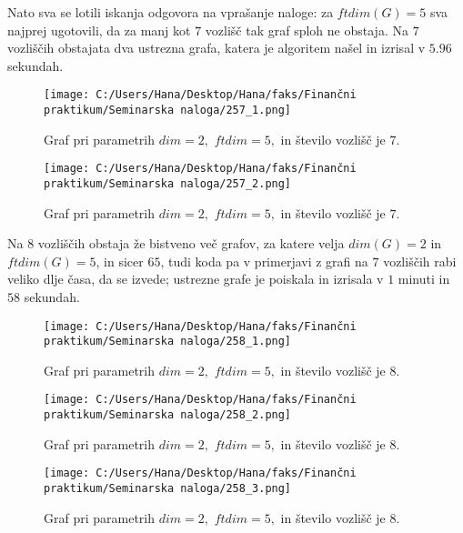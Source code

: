 \documentclass[12pt]{article}
\begin{document}
Nato sva se lotili iskanja odgovora na vprašanje naloge: za $ftdim(G) = 5$ sva najprej ugotovili, da za manj kot $7$ 
vozlišč tak graf sploh ne obstaja. Na $7$ vozliščih obstajata dva ustrezna grafa, katera je algoritem našel in izrisal v 
$5.96$ sekundah.

\begin{figure}[H]
    \centering
    \texttt{[image: C:/Users/Hana/Desktop/Hana/faks/Finančni praktikum/Seminarska naloga/257\_1.png]}
    \caption{Graf pri parametrih $dim = 2,$ $ftdim = 5,$ in število vozlišč je $7.$}
    \label{fig:slika257_1}
\end{figure}

\begin{figure}[H]
    \centering
    \texttt{[image: C:/Users/Hana/Desktop/Hana/faks/Finančni praktikum/Seminarska naloga/257\_2.png]}
    \caption{Graf pri parametrih $dim = 2,$ $ftdim = 5,$ in število vozlišč je $7.$}
    \label{fig:slika257_2}
\end{figure}

Na $8$ vozliščih obstaja že bistveno več grafov, za katere velja $dim(G) = 2$ in $ftdim(G) = 5$, in sicer $65$, tudi koda 
pa v primerjavi z grafi na $7$ vozliščih rabi veliko dlje časa, da se izvede; ustrezne grafe je poiskala in izrisala v $1$ 
minuti in $58$ sekundah. 

\begin{figure}[H]
    \centering
    \texttt{[image: C:/Users/Hana/Desktop/Hana/faks/Finančni praktikum/Seminarska naloga/258\_1.png]}
    \caption{Graf pri parametrih $dim = 2,$ $ftdim = 5,$ in število vozlišč je $8.$}
    \label{fig:slika258_1}
\end{figure}

\begin{figure}[H]
    \centering
    \texttt{[image: C:/Users/Hana/Desktop/Hana/faks/Finančni praktikum/Seminarska naloga/258\_2.png]}
    \caption{Graf pri parametrih $dim = 2,$ $ftdim = 5,$ in število vozlišč je $8.$}
    \label{fig:slika258_2}
\end{figure}

\begin{figure}[H]
    \centering
    \texttt{[image: C:/Users/Hana/Desktop/Hana/faks/Finančni praktikum/Seminarska naloga/258\_3.png]}
    \caption{Graf pri parametrih $dim = 2,$ $ftdim = 5,$ in število vozlišč je $8.$}
    \label{fig:slika258_3}
\end{figure}
\end{document}
